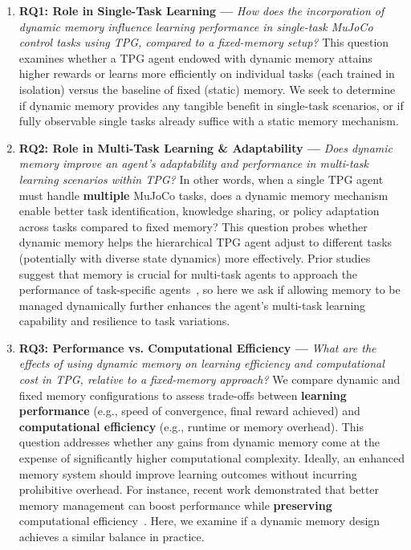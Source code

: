 \documentclass[sigconf]{acmart}
\begin{document}
\begin{enumerate}
    \item \textbf{RQ1: Role in Single-Task Learning ---} \textit{How does the incorporation of dynamic memory influence learning performance in single-task MuJoCo control tasks using TPG, compared to a fixed-memory setup?} This question examines whether a TPG agent endowed with dynamic memory attains higher rewards or learns more efficiently on individual tasks (each trained in isolation) versus the baseline of fixed (static) memory. We seek to determine if dynamic memory provides any tangible benefit in single-task scenarios, or if fully observable single tasks already suffice with a static memory mechanism.

    \item \textbf{RQ2: Role in Multi-Task Learning \& Adaptability ---} \textit{Does dynamic memory improve an agent's adaptability and performance in multi-task learning scenarios within TPG?} In other words, when a single TPG agent must handle \textbf{multiple} MuJoCo tasks, does a dynamic memory mechanism enable better task identification, knowledge sharing, or policy adaptation across tasks compared to fixed memory? This question probes whether dynamic memory helps the hierarchical TPG agent adjust to different tasks (potentially with diverse state dynamics) more effectively. Prior studies suggest that memory is crucial for multi-task agents to approach the performance of task-specific agents~\cite{Kelly21}, so here we ask if allowing memory to be managed dynamically further enhances the agent's multi-task learning capability and resilience to task variations.

    \item \textbf{RQ3: Performance vs. Computational Efficiency ---} \textit{What are the effects of using dynamic memory on learning efficiency and computational cost in TPG, relative to a fixed-memory approach?} We compare dynamic and fixed memory configurations to assess trade-offs between \textbf{learning performance} (e.g., speed of convergence, final reward achieved) and \textbf{computational efficiency} (e.g., runtime or memory overhead). This question addresses whether any gains from dynamic memory come at the expense of significantly higher computational complexity. Ideally, an enhanced memory system should improve learning outcomes without incurring prohibitive overhead. For instance, recent work demonstrated that better memory management can boost performance while \textbf{preserving} computational efficiency~\cite{Djavaherpour24}. Here, we examine if a dynamic memory design achieves a similar balance in practice.


\end{enumerate}
\end{document}
